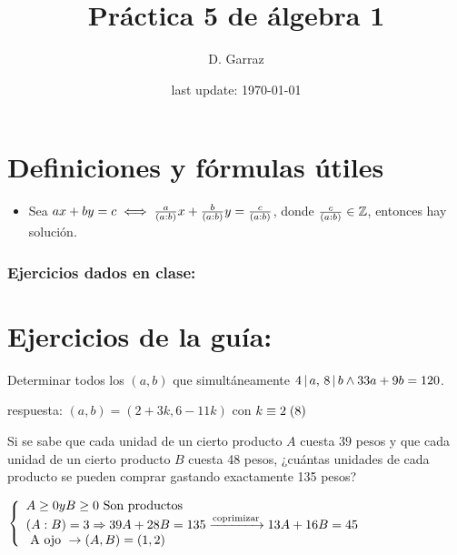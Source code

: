 \documentclass[12pt,a4paper, spanish]{article}
\begin{document}
\pagestyle{empty} %

\title{Práctica 5 de álgebra 1} %
\author{D. Garraz} %
\date{last update: \today} %

\maketitle  %
\section{Definiciones y fórmulas útiles}
\def\mcd{(a:b)}
\begin{itemize}
	\item Sea $ax + by = c \sisolosi \frac{a}{\mcd} x + \frac{b}{\mcd}y = \frac{c}{(a:b)}$,
	      donde $\frac{c}{(a:b)} \in \mathbb Z$, entonces hay solución.
\end{itemize}

\subsubsection*{Ejercicios dados en clase:}

\newpage


\section*{Ejercicios de la guía:}
\setcounter{ejercicio}{0} %
\ejercicio
\ejercicio
Determinar todos los $(a,b)$ que simultáneamente $4 \, | \, a,\, 8 \, | \, b \land 33a + 9b = 120$.

\separadorCorto
respuesta: $(a,b) = (2+3k, 6-11k)$ con $k \equiv 2 \;(8)$\\

\ejercicio
Si se sabe que cada unidad de un cierto producto $A$ cuesta $39$ pesos y que cada unidad de un cierto
producto $B$ cuesta 48 pesos, ¿cuántas unidades de cada producto se pueden comprar gastando exactamente
135 pesos?

\separadorCorto

$
	\llave{l}{
		A \geq 0 y B \geq 0 \text{ Son productos}\\
		(A:B) = 3 \entonces 39A + 28B = 135
		\flecha{coprimizar}
		13A + 16B = 45\\
    \text{ A ojo } \to (A,B) = (1,2)
	}
$
\end{document}
